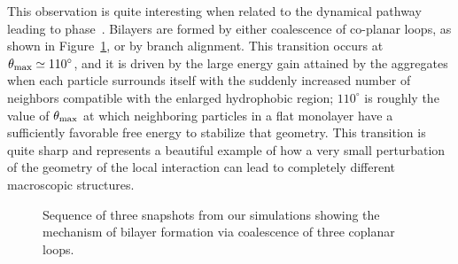 This observation is quite interesting when related to the dynamical pathway leading to phase~.
Bilayers are formed by either coalescence of co-planar loops, as shown in Figure~\ref{fig:loops}, or by branch alignment.
This transition  occurs at $\theta_{\rm max}\simeq 110^\circ$, and it is driven by  the large energy gain attained by the aggregates when each particle surrounds itself with the suddenly increased number of neighbors compatible with the enlarged hydrophobic region; $110 ^\circ$ is roughly the value of $\theta_{\rm max}$ at which neighboring particles in a flat monolayer have a sufficiently favorable free energy to stabilize that geometry.
This transition is quite sharp and represents a beautiful example of how a very small perturbation of the geometry of the local interaction can lead to completely different macroscopic structures.

\begin{figure}
\begin{center}
	\renewcommand{\thesubfigure}{\arabic{subfigure}}

\end{center}
		\caption[Snapshots of bilayer formation]{Sequence of three snapshots from our simulations showing the mechanism of  bilayer formation via coalescence of three coplanar loops.}
		\label{fig:loops}
\end{figure}

